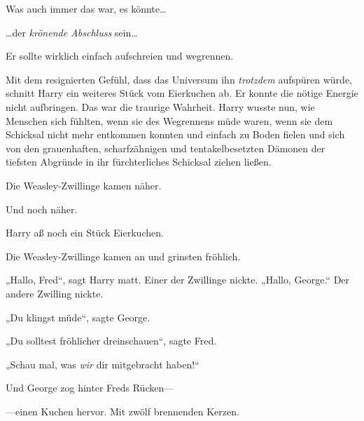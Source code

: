Was auch immer das war, es könnte…

…der \emph{krönende Abschluss} sein…

Er sollte wirklich einfach aufschreien und wegrennen.

Mit dem resignierten Gefühl, dass das Universum ihn \emph{trotzdem} aufspüren würde, schnitt Harry ein weiteres Stück vom Eierkuchen ab. Er konnte die nötige Energie nicht aufbringen. Das war die traurige Wahrheit. Harry wusste nun, wie Menschen sich fühlten, wenn sie des Wegrennens müde waren, wenn sie dem Schicksal nicht mehr entkommen konnten und einfach zu Boden fielen und sich von den grauenhaften, scharfzähnigen und tentakelbesetzten Dämonen der tiefsten Abgründe in ihr fürchterliches Schicksal ziehen ließen.

Die Weasley-Zwillinge kamen näher.

Und noch näher.

Harry aß noch ein Stück Eierkuchen.

Die Weasley-Zwillinge kamen an und grinsten fröhlich.

„Hallo, Fred“, sagt Harry matt. Einer der Zwillinge nickte. „Hallo, George.“ Der andere Zwilling nickte.

„Du klingst müde“, sagte George.

„Du solltest fröhlicher dreinschauen“, sagte Fred.

„Schau mal, was \emph{wir} dir mitgebracht haben!“

Und George zog hinter Freds Rücken—

—einen Kuchen hervor. Mit zwölf brennenden Kerzen.

